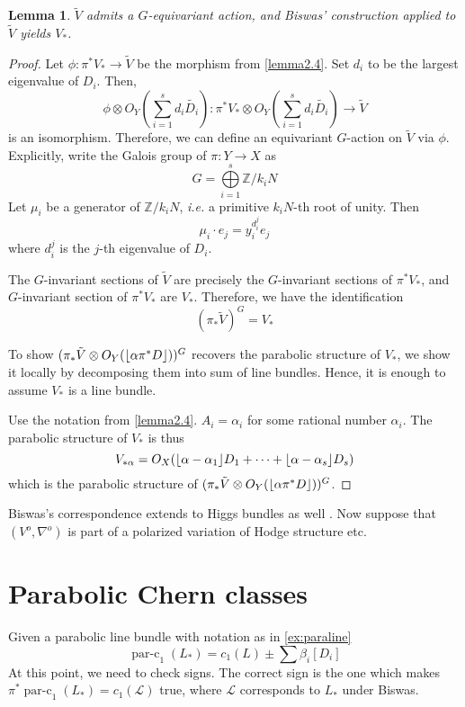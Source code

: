 \documentclass{amsart}
\newtheorem{lemma}[thm]{Lemma}
\DeclareMathOperator*{\parc}{par-c}
\newcommand{\integer}{\mathbb{Z}}
\newcommand{\pullback}[1]{{#1}^*}
\newcommand{\pushforward}[1]{{#1}_*}
\DeclarePairedDelimiter\floor{\lfloor}{\rfloor}
\begin{document}
\begin{lemma}
$\tilde V$ admits a $G$-equivariant action, 
and Biswas' construction applied to  $\tilde V$ yields $V_*$.
\end{lemma}

\begin{proof}
Let $\phi: \pullback{\pi}V_* \rightarrow \tilde V$ be the morphism from \ref{lemma2.4}. 
Set $d_i$ to be the largest eigenvalue of $D_i$. Then,
\[
    \phi\otimes O_Y(\sum\limits_{i=1}^{s}d_i\tilde{D_i}) :
        \pullback{\pi}V_*\otimes O_Y(\sum\limits_{i=1}^{s}d_i\tilde{D_i})
        \rightarrow \tilde V
\]
is an isomorphism. Therefore, we can define an equivariant $G$-action on $\tilde V$ via
$\phi$. Explicitly, write the Galois group of $\pi: Y\rightarrow X$ as
\[
    G = \bigoplus\limits_{i=1}^{s}\integer/k_iN
\]
Let $\mu_i$ be a generator of $\integer/k_iN$, \emph{i.e.} a primitive $k_iN$-th root of unity.
Then
\[
    \mu_i\cdot e_j = y_i^{d_i^j}e_j
\]
where $d_i^j$ is the $j$-th eigenvalue of $D_i$.

The $G$-invariant sections of $\tilde V$ are precisely the $G$-invariant sections of 
$\pullback{\pi}V_*$, and $G$-invariant section of $\pullback{\pi}V_*$ are $V_*$. 
Therefore, we have the identification
\[
    (\pushforward{\pi}\tilde V)^G = V_*
\]

\newcommand{\parabolic}{(\pushforward{\pi}\tilde V\otimes O_Y(\floor{\alpha\pullback{\pi}D}))^G}
To show $\parabolic$ recovers the parabolic structure of $V_*$, we show it locally by 
decomposing them into sum of line bundles. Hence, it is enough to assume $V_*$ is
a line bundle. 

Use the notation from \ref{lemma2.4}. $A_i = \alpha_i$ for some rational number $\alpha_i$.
The parabolic structure of $V_*$ is thus
\[
    V_{*\alpha} = O_X(\floor{\alpha - \alpha_1}D_1 + \cdots + \floor{\alpha - \alpha_s}D_s)
\]
which is the parabolic structure of $\parabolic$. 
\end{proof}



Biswas's correspondence  extends to Higgs bundles as well \cite[thm 5.5]{biswas2}.
Now suppose that $(V^o,\nabla^o)$ is part of a polarized variation of Hodge structure {\color{red} etc.}


\section{Parabolic Chern classes}

Given a parabolic line bundle with notation as in \ref{ex:paraline}
$${\parc}_1(L_*)= c_1(L)\pm \sum\beta_i[D_i]$$
 {\color{red}At this point, we need to check signs. The correct sign is the one which makes
 $\pi^* \parc_1(L_*)=  c_1(\mathcal{L})$ true, where $\mathcal{L}$ corresponds to $L_*$ under Biswas.}
\end{document}
